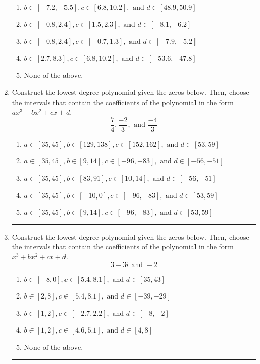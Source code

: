 \documentclass[14pt]{extbook}
\newcommand{\litem}[1]{\item#1\hspace*{-1cm}\rule{\textwidth}{0.4pt}}
\begin{document}
\begin{enumerate}
{\begin{enumerate}[label=\Alph*.]
\item \( b \in [-7.2, -5.5], c \in [6.8, 10.2], \text{ and } d \in [48.9, 50.9] \)
\item \( b \in [-0.8, 2.4], c \in [1.5, 2.3], \text{ and } d \in [-8.1, -6.2] \)
\item \( b \in [-0.8, 2.4], c \in [-0.7, 1.3], \text{ and } d \in [-7.9, -5.2] \)
\item \( b \in [2.7, 8.3], c \in [6.8, 10.2], \text{ and } d \in [-53.6, -47.8] \)
\item \( \text{None of the above.} \)

\end{enumerate} }
\litem{
Construct the lowest-degree polynomial given the zeros below. Then, choose the intervals that contain the coefficients of the polynomial in the form $ax^3+bx^2+cx+d$.\[ \frac{7}{4}, \frac{-2}{3}, \text{ and } \frac{-4}{3} \]\begin{enumerate}[label=\Alph*.]
\item \( a \in [35, 45], b \in [129, 138], c \in [152, 162], \text{ and } d \in [53, 59] \)
\item \( a \in [35, 45], b \in [9, 14], c \in [-96, -83], \text{ and } d \in [-56, -51] \)
\item \( a \in [35, 45], b \in [83, 91], c \in [10, 14], \text{ and } d \in [-56, -51] \)
\item \( a \in [35, 45], b \in [-10, 0], c \in [-96, -83], \text{ and } d \in [53, 59] \)
\item \( a \in [35, 45], b \in [9, 14], c \in [-96, -83], \text{ and } d \in [53, 59] \)

\end{enumerate} }
\litem{
Construct the lowest-degree polynomial given the zeros below. Then, choose the intervals that contain the coefficients of the polynomial in the form $x^3+bx^2+cx+d$.\[ 3 - 3 i \text{ and } -2 \]\begin{enumerate}[label=\Alph*.]
\item \( b \in [-8, 0], c \in [5.4, 8.1], \text{ and } d \in [35, 43] \)
\item \( b \in [2, 8], c \in [5.4, 8.1], \text{ and } d \in [-39, -29] \)
\item \( b \in [1, 2], c \in [-2.7, 2.2], \text{ and } d \in [-8, -2] \)
\item \( b \in [1, 2], c \in [4.6, 5.1], \text{ and } d \in [4, 8] \)
\item \( \text{None of the above.} \)


\end{enumerate}}
\end{enumerate}
\end{document}
